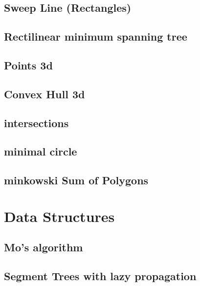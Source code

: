 \subsection{Sweep Line (Rectangles)}
\raggedbottom
\hrulefill
\subsection{Rectilinear minimum spanning tree}
\raggedbottom
\hrulefill
\subsection{Points 3d}
\raggedbottom
\hrulefill
\subsection{Convex Hull 3d}
\raggedbottom
\hrulefill
\subsection{intersections}
\raggedbottom
\hrulefill
\subsection{minimal circle}
\raggedbottom
\hrulefill
\subsection{minkowski Sum of Polygons}
\raggedbottom
\hrulefill

\section{Data Structures}
\subsection{Mo's algorithm}
\raggedbottom
\hrulefill
\subsection{Segment Trees with lazy propagation}
\raggedbottom
\hrulefill
